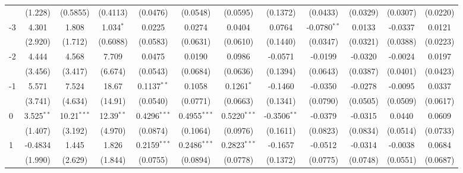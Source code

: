 \begin{table}[htbp]
\begin{tabular}{lccccccccccc}
                           & (1.228)      & (0.5855)      & (0.4113)     & (0.0476)       & (0.0548)       & (0.0595)       & (0.1372)                 & (0.0433)       & (0.0329)       & (0.0307)         & (0.0220)\\   
      -3                   & 4.301        & 1.808         & 1.034$^{*}$  & 0.0225         & 0.0274         & 0.0404         & 0.0764                   & -0.0780$^{**}$ & 0.0133         & -0.0337          & 0.0121\\   
                           & (2.920)      & (1.712)       & (0.6088)     & (0.0583)       & (0.0631)       & (0.0610)       & (0.1440)                 & (0.0347)       & (0.0321)       & (0.0388)         & (0.0223)\\   
      -2                   & 4.444        & 4.568         & 7.709        & 0.0475         & 0.0190         & 0.0986         & -0.0571                  & -0.0199        & -0.0320        & -0.0024          & 0.0197\\   
                           & (3.456)      & (3.417)       & (6.674)      & (0.0543)       & (0.0684)       & (0.0636)       & (0.1394)                 & (0.0643)       & (0.0387)       & (0.0401)         & (0.0423)\\   
      -1                   & 5.571        & 7.524         & 18.67        & 0.1137$^{**}$  & 0.1058         & 0.1261$^{*}$   & -0.1460                  & -0.0350        & -0.0278        & -0.0095          & 0.0337\\   
                           & (3.741)      & (4.634)       & (14.91)      & (0.0540)       & (0.0771)       & (0.0663)       & (0.1341)                 & (0.0790)       & (0.0505)       & (0.0509)         & (0.0617)\\   
      0                    & 3.525$^{**}$ & 10.21$^{***}$ & 12.39$^{**}$ & 0.4296$^{***}$ & 0.4955$^{***}$ & 0.5220$^{***}$ & -0.3506$^{**}$           & -0.0379        & -0.0315        & 0.0440           & 0.0609\\   
                           & (1.407)      & (3.192)       & (4.970)      & (0.0874)       & (0.1064)       & (0.0976)       & (0.1611)                 & (0.0823)       & (0.0834)       & (0.0514)         & (0.0733)\\   
      1                    & -0.4834      & 1.445         & 1.826        & 0.2159$^{***}$ & 0.2486$^{***}$ & 0.2823$^{***}$ & -0.1657                  & -0.0512        & -0.0314        & -0.0038          & 0.0684\\   
                           & (1.990)      & (2.629)       & (1.844)      & (0.0755)       & (0.0894)       & (0.0778)       & (0.1372)                 & (0.0775)       & (0.0748)       & (0.0551)         & (0.0687)\\   

\end{tabular}
\end{table}
